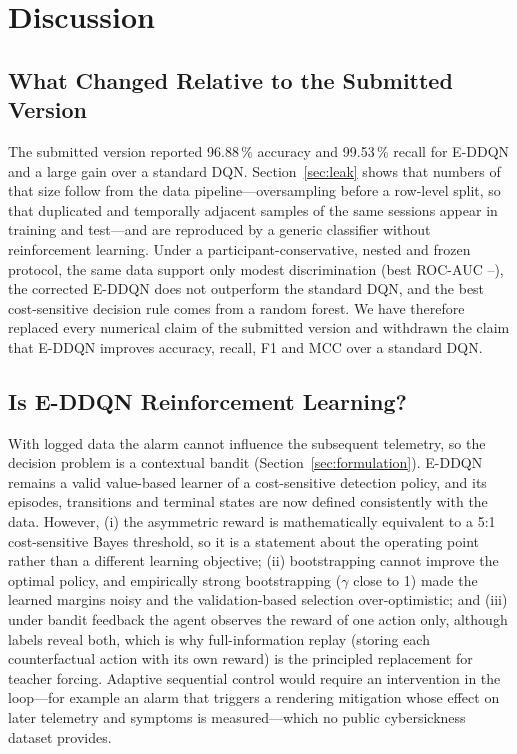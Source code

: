 \section{Discussion}
\label{sec:discussion}

\subsection{What Changed Relative to the Submitted Version}
The submitted version reported 96.88\,\% accuracy and 99.53\,\% recall for E-DDQN and a large gain over a standard DQN. Section~\ref{sec:leak} shows that numbers of that size follow from the data pipeline---oversampling before a row-level split, so that duplicated and temporally adjacent samples of the same sessions appear in training and test---and are reproduced by a generic classifier without reinforcement learning. Under a participant-conservative, nested and frozen protocol, the same data support only modest discrimination (best ROC-AUC \RFCostRocAucMean--\HGBCostRocAucMean), the corrected E-DDQN does not outperform the standard DQN, and the best cost-sensitive decision rule comes from a random forest. We have therefore replaced every numerical claim of the submitted version and withdrawn the claim that E-DDQN improves accuracy, recall, F1 and MCC over a standard DQN.

\subsection{Is E-DDQN Reinforcement Learning?}
With logged data the alarm cannot influence the subsequent telemetry, so the decision problem is a contextual bandit (Section~\ref{sec:formulation}). E-DDQN remains a valid value-based learner of a cost-sensitive detection policy, and its episodes, transitions and terminal states are now defined consistently with the data. However, (i) the asymmetric reward is mathematically equivalent to a 5:1 cost-sensitive Bayes threshold, so it is a statement about the operating point rather than a different learning objective; (ii) bootstrapping cannot improve the optimal policy, and empirically strong bootstrapping ($\gamma$ close to 1) made the learned margins noisy and the validation-based selection over-optimistic; and (iii) under bandit feedback the agent observes the reward of one action only, although labels reveal both, which is why full-information replay (storing each counterfactual action with its own reward) is the principled replacement for teacher forcing. Adaptive sequential control would require an intervention in the loop---for example an alarm that triggers a rendering mitigation whose effect on later telemetry and symptoms is measured---which no public cybersickness dataset provides.

